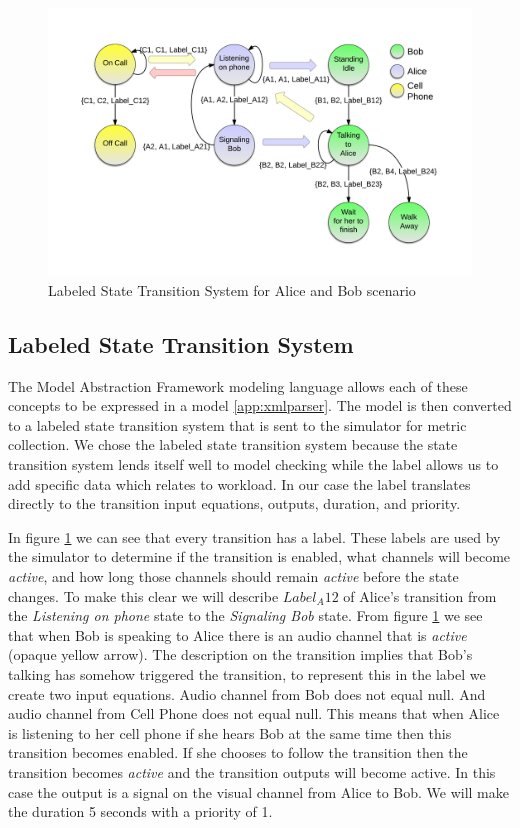 \begin{figure}[h]
\begin{center}
\includegraphics[width=\textwidth]{ab_lsts.png}
\caption{Labeled State Transition System for Alice and Bob scenario}
\label{fig:ab_lsts}
\end{center}
\end{figure}

\subsection{Labeled State Transition System}
The Model Abstraction Framework modeling language allows each of these concepts to be expressed in a model \ref{app:xmlparser}.  The model is then converted to a labeled state transition system that is sent to the simulator for metric collection.  We chose the labeled state transition system because the state transition system lends itself well to model checking while the label allows us to add specific data which relates to workload.  In our case the label translates directly to the transition input equations, outputs, duration, and priority.

In figure \ref{fig:ab_lsts} we can see that every transition has a label.  These labels are used by the simulator to determine if the transition is enabled, what channels will become {\em active}, and how long those channels should remain {\em active} before the state changes.  To make this clear we will describe $Label_A12$ of Alice's transition from the {\em Listening on phone} state to the {\em Signaling Bob} state.  From figure \ref{fig:ab_lsts} we see that when Bob is speaking to Alice there is an audio channel that is {\em active} (opaque yellow arrow).  The description on the transition implies that Bob's talking has somehow triggered the transition, to represent this in the label we create two input equations.  Audio channel from Bob does not equal null.  And audio channel from Cell Phone does not equal null.  This means that when Alice is listening to her cell phone if she hears Bob at the same time then this transition becomes enabled.  If she chooses to follow the transition then the transition becomes {\em active} and the transition outputs will become active.  In this case the output is a signal on the visual channel from Alice to Bob.  We will make the duration 5 seconds with a priority of 1.  

